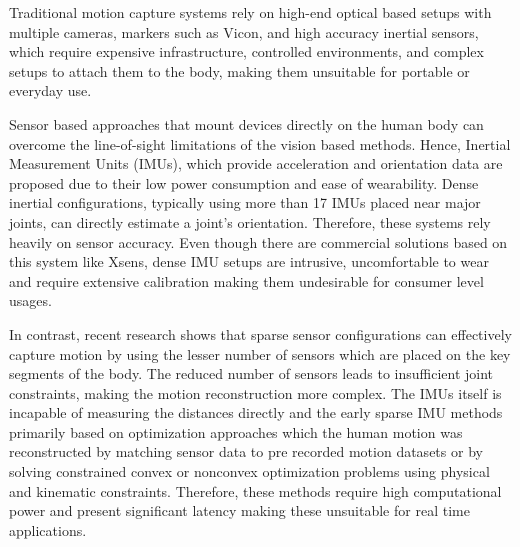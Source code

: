 \documentclass[12pt, a4paper, oneside]{report}
\begin{document}
\noindent Traditional motion capture systems rely on high-end optical based setups with multiple cameras, markers such as Vicon, and high accuracy inertial sensors, which require expensive infrastructure, controlled environments, and complex setups to attach them to the body, making them unsuitable for portable or everyday use.\vspace{\baselineskip}

\noindent Sensor based approaches that mount devices directly on the human body can overcome the line-of-sight limitations of the vision based methods. Hence, Inertial Measurement Units (\ac{IMU}s), which provide acceleration and orientation data are proposed due to their low power consumption and ease of wearability. Dense inertial configurations, typically using more than 17 \ac{IMU}s placed near major joints, can directly estimate a joint's orientation. Therefore, these systems rely heavily on sensor accuracy. Even though there are commercial solutions based on this system like Xsens, dense \ac{IMU} setups are intrusive, uncomfortable to wear and require extensive calibration making them undesirable for consumer level usages\cite{yi2021transpose}.\vspace{\baselineskip}

\noindent In contrast, recent research shows that sparse sensor configurations can effectively capture motion by using the lesser number of sensors which are placed on the key segments of the body. The reduced number of sensors leads to insufficient joint constraints, making the motion reconstruction more complex. The \ac{IMU}s itself is incapable of measuring the distances directly and the early sparse \ac{IMU} methods primarily based on optimization approaches which the human motion was reconstructed by matching sensor data to pre recorded motion datasets or by solving constrained convex or nonconvex optimization problems using physical and kinematic constraints. Therefore, these methods require high computational power and present significant latency making these unsuitable for real time applications.\vspace{\baselineskip}
\end{document}
